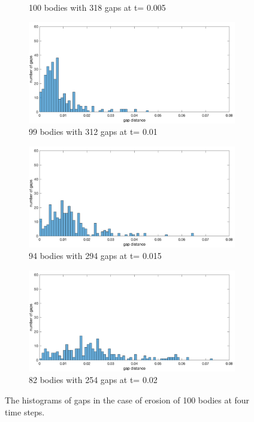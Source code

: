 \documentclass[preprint, 10pt]{elsarticle}
\begin{document}
{\begin{figure}[H]
\begin{subfigure}[b]{0.5\textwidth}
\caption{100 bodies with 318 gaps at t= 0.005}
\end{subfigure}%
\begin{subfigure}[b]{0.5\textwidth}
\includegraphics*[width =\linewidth]{./figs/gap_hist100_100}
\caption{99 bodies with 312 gaps at t= 0.01}
\end{subfigure}
\begin{subfigure}[b]{0.5\textwidth}
\includegraphics*[width =\linewidth]{./figs/gap_hist100_150}
\caption{94 bodies with 294 gaps at t= 0.015}
\end{subfigure}%
\begin{subfigure}[b]{0.5\textwidth}
\includegraphics*[width =\linewidth]{./figs/gap_hist100_200}
\caption{82 bodies with 254 gaps at t= 0.02}
\end{subfigure}
\caption{\label{fig:Eroding100gap} The histograms of gaps in the case of erosion of 100 bodies at four time steps.}
\end{figure}

}
\end{document}
